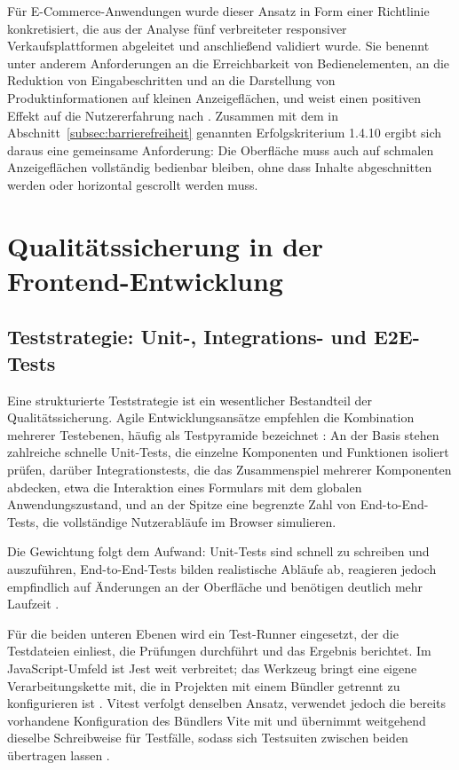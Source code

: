 Für E-Commerce-Anwendungen wurde dieser Ansatz in Form einer
Richtlinie konkretisiert, die aus der Analyse fünf verbreiteter
responsiver Verkaufsplattformen abgeleitet und anschließend
validiert wurde. Sie benennt unter anderem Anforderungen an die
Erreichbarkeit von Bedienelementen, an die Reduktion von
Eingabeschritten und an die Darstellung von Produktinformationen
auf kleinen Anzeigeflächen, und weist einen positiven Effekt auf
die Nutzererfahrung nach \cite{kumar_mobile_first}. Zusammen mit
dem in Abschnitt~\ref{subsec:barrierefreiheit} genannten
Erfolgskriterium 1.4.10 ergibt sich daraus eine gemeinsame
Anforderung: Die Oberfläche muss auch auf schmalen Anzeigeflächen
vollständig bedienbar bleiben, ohne dass Inhalte abgeschnitten
werden oder horizontal gescrollt werden muss.
\section{Qualitätssicherung in der Frontend-Entwicklung}
\label{sec:qualitaetssicherung}

\subsection{Teststrategie: Unit-, Integrations- und E2E-Tests}
\label{subsec:teststrategie}

Eine strukturierte Teststrategie ist ein wesentlicher Bestandteil der
Qualitätssicherung. Agile Entwicklungsansätze empfehlen die
Kombination mehrerer Testebenen, häufig als Testpyramide bezeichnet
\cite{cohn_agile}: An der Basis stehen zahlreiche schnelle Unit-Tests,
die einzelne Komponenten und Funktionen isoliert prüfen, darüber
Integrationstests, die das Zusammenspiel mehrerer Komponenten
abdecken, etwa die Interaktion eines Formulars mit dem globalen
Anwendungszustand, und an der Spitze eine begrenzte Zahl von
End-to-End-Tests, die vollständige Nutzerabläufe im Browser
simulieren.

Die Gewichtung folgt dem Aufwand: Unit-Tests sind schnell zu schreiben
und auszuführen, End-to-End-Tests bilden realistische Abläufe ab,
reagieren jedoch empfindlich auf Änderungen an der Oberfläche und
benötigen deutlich mehr Laufzeit \cite{cohn_agile}.

Für die beiden unteren Ebenen wird ein Test-Runner eingesetzt, der die
Testdateien einliest, die Prüfungen durchführt und das Ergebnis
berichtet. Im JavaScript-Umfeld ist Jest weit verbreitet; das Werkzeug
bringt eine eigene Verarbeitungskette mit, die in Projekten mit einem
Bündler getrennt zu konfigurieren ist \cite{jest_docs}. Vitest
verfolgt denselben Ansatz, verwendet jedoch die bereits vorhandene
Konfiguration des Bündlers Vite mit und übernimmt weitgehend dieselbe
Schreibweise für Testfälle, sodass sich Testsuiten zwischen beiden
übertragen lassen \cite{vitest_docs}.

